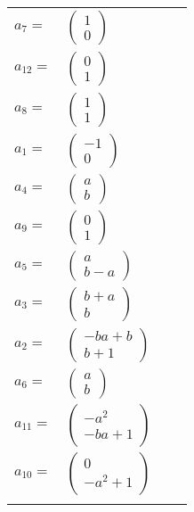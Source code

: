 \documentclass[1p]{elsarticle_modified}
\theoremstyle{definition}
\begin{document}
\begin{tabular}{m{7pt} m{180pt} m{7pt} m{180pt} }
\flushright $a_{7}=$&$\begin{pmatrix}1\\0\end{pmatrix}$ \\
\flushright $a_{12}=$&$\begin{pmatrix}0\\1\end{pmatrix}$ \\
\flushright $a_{8}=$&$\begin{pmatrix}1\\1\end{pmatrix}$ \\
\flushright $a_{1}=$&$\begin{pmatrix}-1\\0\end{pmatrix}$ \\
\flushright $a_{4}=$&$\begin{pmatrix}a\\b\end{pmatrix}$ \\
\flushright $a_{9}=$&$\begin{pmatrix}0\\1\end{pmatrix}$ \\
\flushright $a_{5}=$&$\begin{pmatrix}a\\b- a\end{pmatrix}$ \\
\flushright $a_{3}=$&$\begin{pmatrix}b+a\\b\end{pmatrix}$ \\
\flushright $a_{2}=$&$\begin{pmatrix}- b a+b\\b+1\end{pmatrix}$ \\
\flushright $a_{6}=$&$\begin{pmatrix}a\\b\end{pmatrix}$ \\
\flushright $a_{11}=$&$\begin{pmatrix}- a^2\\- b a+1\end{pmatrix}$ \\
\flushright $a_{10}=$&$\begin{pmatrix}0\\- a^2+1\end{pmatrix}$\\&\end{tabular}
\end{document}
